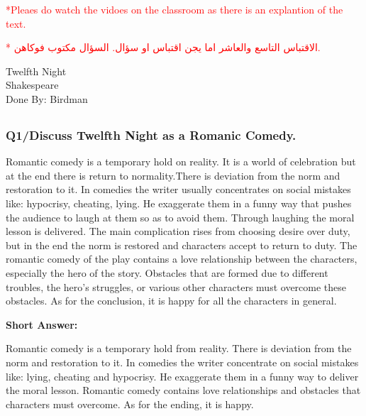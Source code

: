 \documentclass[12pt, a4paper]{article}
\begin{document}
\small{\textcolor{red}{*Pleaes do watch the vidoes on the classroom as 
there is an explantion of the text.}}

\begin{otherlanguage}{arabic}
  \textcolor{red}{
*  الاقتباس  التاسع والعاشر اما يجن اقتباس او سؤال. السؤال مكتوب فوكاهن.
  }
\end{otherlanguage}

\begin{center}
{\fonthead
\huge{Twelfth Night}\\[0.2cm]
\Large{Shakespeare}\\[0.5cm]
\large{Done By: Birdman}\\[1cm]
}
\end{center}



\subsection*{}\bigbreak

\subsubsection*{Q1/Discuss Twelfth Night as a Romanic Comedy.}
Romantic comedy is a temporary hold on reality. It is a world of 
celebration but at the end there is return to normality.There is 
deviation from
the norm and restoration to it. In comedies the writer usually 
concentrates on social mistakes like: hypocrisy, cheating, lying. He
exaggerate them in a funny way that pushes the audience to laugh at them so as to avoid them. 
Through laughing the moral lesson is delivered. The main complication
rises from choosing desire over duty, but in the end the norm is
restored and characters accept to return to duty. The romantic comedy
of the play contains a love relationship between the characters, 
especially the hero of the story. Obstacles that are formed due to 
different troubles, the hero's struggles, or various other characters
must overcome these obstacles. As for the conclusion, it is happy for 
all the characters in general.\medbreak

\textbf{Short Answer:}\medbreak

Romantic comedy is a temporary hold from reality. There is deviation from
the norm and restoration to it. In comedies the writer concentrate on
social mistakes like: lying, cheating and hypocrisy. He exaggerate them
in a funny way to deliver the moral lesson. Romantic comedy contains
love relationships and obstacles that characters must overcome. As
for the ending, it is happy.
\end{document}
